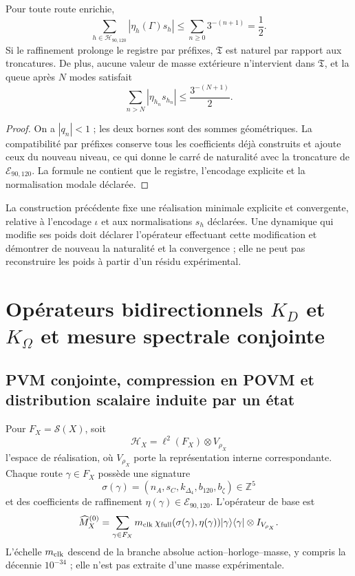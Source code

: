 \begin{theorem}
Pour toute route enrichie,
\[
 \sum_{h\in\mathcal H_{90,120}}|\eta_h(\Gamma)s_h|
 \leq\sum_{n\ge0}3^{-(n+1)}=\frac12.
\]
Si le raffinement prolonge le registre par préfixes, \(\mathfrak T\) est naturel
par rapport aux troncatures. De plus, aucune valeur de masse extérieure n'intervient
dans \(\mathfrak T\), et la queue après \(N\) modes satisfait
\[
 \sum_{n>N}|\eta_{h_n}s_{h_n}|
 \leq\frac{3^{-(N+1)}}2.
\]
\end{theorem}

\begin{proof}
On a \(|q_n|<1\) ; les deux bornes sont des sommes géométriques. La compatibilité
par préfixes conserve tous les coefficients déjà construits et ajoute ceux du
nouveau niveau, ce qui donne le carré de naturalité avec la troncature de
\(\mathcal E_{90,120}\). La formule ne contient que le registre, l'encodage
explicite et la normalisation modale déclarée.
\end{proof}

La construction précédente fixe une réalisation minimale explicite et convergente,
relative à l'encodage \(\iota\) et aux normalisations \(s_h\) déclarées.
Une dynamique qui modifie ses poids doit déclarer l'opérateur effectuant cette
modification et démontrer de nouveau la naturalité et la convergence ; elle ne peut pas
reconstruire les poids à partir d'un résidu expérimental.

\section{Opérateurs bidirectionnels \texorpdfstring{\(K_D\) et \(K_\Omega\)}{K_D et K_Omega} et mesure spectrale conjointe}

\subsection{PVM conjointe, compression en POVM et distribution scalaire induite par un état}

Pour \(F_X=\mathscr S(X)\), soit
\[
 \mathcal H_X=\ell^2(F_X)\otimes V_{\rho_X}
\]
l'espace de réalisation, où \(V_{\rho_X}\) porte la représentation
interne correspondante. Chaque route \(\gamma\in F_X\) possède une signature
\[
 \sigma(\gamma)
 =(n_A,s_C,k_{\Delta_4},b_{120},b_\zeta)\in\mathbb Z^5
\]
et des coefficients de raffinement
\(\eta(\gamma)\in\mathcal E_{90,120}\). L'opérateur de base est
\[
 \widehat M_X^{(0)}
 =\sum_{\gamma\in F_X}
 m_{\rm clk}\,
 \chi_{\rm full}(\sigma(\gamma),\eta(\gamma))
 |\gamma\rangle\langle\gamma|\otimes I_{V_{\rho_X}}.
\]
L'échelle \(m_{\rm clk}\) descend de la branche absolue
action--horloge--masse, y compris la décennie \(10^{-34}\) ; elle n'est pas extraite d'une
masse expérimentale.

